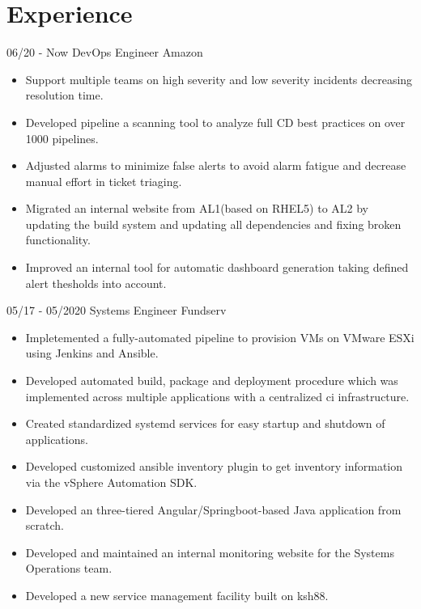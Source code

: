 \documentclass[]{friggeri-cv}
\begin{document}
\section{Experience}
\begin{entrylist}
  \entry
    {06/20 - Now}
    {DevOps Engineer}
    {Amazon}
    {\begin{itemize}
        \item Support multiple teams on high severity and low severity incidents decreasing resolution time.
        \item Developed pipeline a scanning tool to analyze full CD best practices on over 1000 pipelines.
        \item Adjusted alarms to minimize false alerts to avoid alarm fatigue and decrease manual effort in ticket triaging.
        \item Migrated an internal website from AL1(based on RHEL5) to AL2 by updating the build system and updating all dependencies and fixing broken functionality.
        \item Improved an internal tool for automatic dashboard generation taking defined alert thesholds into account.
    \end{itemize}}
  \entry
    {05/17 - 05/2020}
    {Systems Engineer}
    {Fundserv}
    {\begin{itemize}
        \item Impletemented a fully-automated pipeline to provision VMs on VMware ESXi using Jenkins and Ansible.
        \item Developed automated build, package and deployment procedure which was implemented across multiple applications with a centralized ci infrastructure.
        \item Created standardized systemd services for easy startup and shutdown of applications.
        \item Developed customized ansible inventory plugin to get inventory information via the vSphere Automation SDK.
        \item Developed an three-tiered Angular/Springboot-based Java application from scratch.
        \item Developed and maintained an internal monitoring website for the Systems Operations team.
        \item Developed a new service management facility built on ksh88.
    \end{itemize}}
\end{entrylist}
\end{document}
